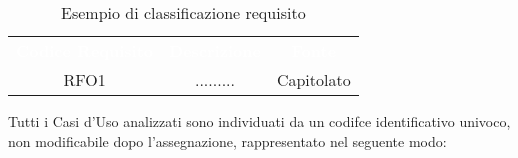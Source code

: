 \begin{table}[h]
	\centering
	\caption{Esempio di classificazione requisito} 
	
\renewcommand{\arraystretch}{1.5}
\begin{tabular}{c c c} 
	
	\rowcolor{darkblue}
	\textcolor{white}{\textbf{Codice Requisito}}&
	\textcolor{white}{\textbf{Descrizione}}&
	\textcolor{white}{\textbf{Fonte}}\\	
	
	RFO1 & ......... & Capitolato\\
	
\end{tabular}
\end{table}

Tutti i Casi d'Uso analizzati sono individuati da un codifce identificativo univoco, non modificabile dopo l'assegnazione, rappresentato nel seguente modo:

